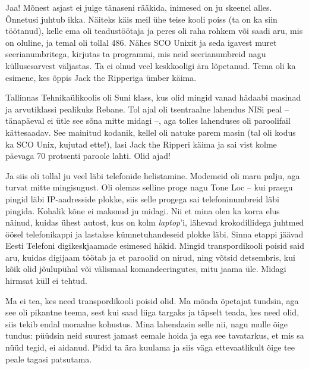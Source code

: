 
Jaa! Mõnest asjast ei julge tänaseni rääkida, inimesed on ju skeenel 
alles. Õnnetusi juhtub ikka. Näiteks käis meil ühe teise kooli poiss (ta on 
ka siin 
töötanud), kelle ema oli teadustöötaja ja peres oli raha rohkem või saadi aru, mis on 
oluline, ja temal oli tollal 486. Nähes SCO Unixit ja seda igavest 
muret seerianumbritega, kirjutas ta programmi, mis neid 
seerianumbreid nagu küllusesarvest väljastas. Ta ei olnud veel keskkooligi ära 
lõpetanud. Tema oli ka esimene, kes õppis Jack the Ripperiga ümber käima. 

Tallinnas Tehnikaülikoolis oli Suni klass, kus olid 
mingid vanad hädaabi masinad ja arvutiklassi pealikuks Rebane. Tol ajal oli
tsentraalne lahendus NISi peal -- tänapäeval ei ütle see sõna mitte midagi --, 
aga tolles lahenduses oli paroolifail kättesaadav. See mainitud
kodanik, kellel oli natuke parem masin (tal oli kodus ka SCO 
Unix, kujutad ette!), lasi Jack the Ripperi käima ja sai vist kolme päevaga 70 protsenti paroole lahti. Olid ajad!

Ja siis oli tollal ju veel läbi telefonide helistamine. Modemeid oli maru palju, aga 
turvat mitte mingisugust. Oli olemas selline proge nagu Tone Loc -- kui praegu pingid 
läbi IP-aadresside plokke, siis selle progega sai telefoninumbreid läbi pingida. Kohalik kõne ei maksnud ju midagi. Nii et mina 
olen ka korra elus näinud, kuidas ühest autost, kus on kolm \emph{laptop}'i, 
lähevad krokodillidega juhtmed öösel telefonikappi ja lastakse kümnetuhandeseid 
plokke läbi. Sinna etappi jäävad Eesti Telefoni digikeskjaamade esimesed 
häkid. Mingid transpordikooli poisid said aru, kuidas digijaam töötab ja et paroolid on nirud, ning võtsid detsembris, kui kõik olid jõulupühal või 
välismaal komandeeringutes, mitu jaama üle. Midagi hirmsat küll ei tehtud. 


Ma ei tea, kes need transpordikooli poisid olid. Ma mõnda õpetajat 
tundsin, aga see oli pikantne teema, sest kui saad liiga 
targaks ja täpselt teada, kes need olid, siis 
tekib endal moraalne kohustus. Mina lahendasin selle nii, nagu mulle õige 
tundus: püüdsin neid suurest jamast eemale hoida ja ega see tavatarkus, 
et mis sa nüüd tegid, ei aidanud. Pidid ta ära kuulama ja 
siis väga ettevaatlikult õige tee peale tagasi patsutama. 

